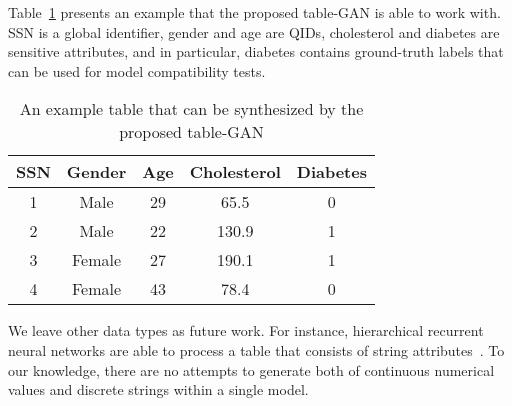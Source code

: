 Table~\ref{T:example} presents an example that the proposed table-GAN is able to work with. SSN is a global identifier, gender and age are QIDs, cholesterol and diabetes are sensitive attributes, and in particular, diabetes contains ground-truth labels that can be used for model compatibility tests.

\begin{table}[t]
\small
\caption{An example table that can be synthesized by the proposed table-GAN\label{T:example}}
\vspace{-1em}
\begin{center}
\begin{tabular}{| c | c | c | c | c | }
\hline
SSN  & Gender & Age & Cholesterol & Diabetes \\
\hline
1 & Male &  29 & 65.5 &  0  \\ 
2 & Male &  22 & 130.9 &  1 \\ 
3 & Female &  27 & 190.1 &  1  \\ 
4 & Female &  43 & 78.4 &  0  \\
\hline
\end{tabular}
\end{center}
\end{table}

We leave other data types as future work. For instance, hierarchical recurrent neural networks are able to process a table that consists of string attributes~\cite{ElHihi:1995:HRN:2998828.2998898}. To our knowledge, there are no attempts to generate both of continuous numerical values and discrete strings within a single model.